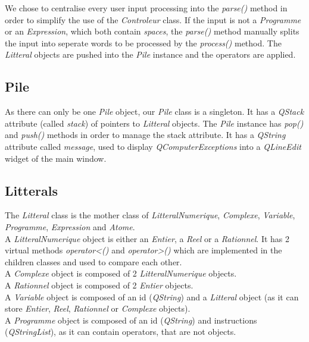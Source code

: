 \documentclass[titlepage]{article}
\begin{document}
    We chose to centralise every user input processing into the \textit{parse()} method in order to simplify the use of the \textit{Controleur} class. If the input is not a \textit{Programme} or an \textit{Expression}, which both contain \textit{spaces}, the \textit{parse()} method manually splits the input into seperate words to be processed by the \textit{process()} method. The \textit{Litteral} objects are pushed into the \textit{Pile} instance and the operators are applied.

    \subsection{Pile}

    As there can only be one \textit{Pile} object, our \textit{Pile} class is a singleton. It has a \textit{QStack} attribute (called \textit{stack}) of pointers to \textit{Litteral} objects. The \textit{Pile} instance has \textit{pop()} and \textit{push()} methods in order to manage the stack attribute. It has a \textit{QString} attribute called \textit{message}, used to display \textit{QComputerExceptions} into a \textit{QLineEdit} widget of the main window.

    \subsection{Litterals}

    The \textit{Litteral} class is the mother class of \textit{LitteralNumerique}, \textit{Complexe}, \textit{Variable}, \textit{Programme}, \textit{Expression} and \textit{Atome}.\\
    A \textit{LitteralNumerique} object is either an \textit{Entier}, a \textit{Reel} or a \textit{Rationnel}. It has 2 virtual methods \textit{operator<()} and \textit{operator>()} which are implemented in the children classes and used to compare each other.\\
    A \textit{Complexe} object is composed of 2 \textit{LitteralNumerique} objects.\\
    A \textit{Rationnel} object is composed of 2 \textit{Entier} objects.\\
    A \textit{Variable} object is composed of an id (\textit{QString}) and a \textit{Litteral} object (as it can store \textit{Entier}, \textit{Reel}, \textit{Rationnel} or \textit{Complexe} objects).\\
    A \textit{Programme} object is composed of an id (\textit{QString}) and instructions (\textit{QStringList}), as it can contain operators, that are not objects.
\end{document}
